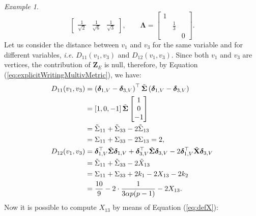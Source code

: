 \documentclass[12pt]{article}
\theoremstyle{plain}
\theoremstyle{remark}
\newtheorem*{example}{Example}
\newcommand{\round}[1]{\left( #1 \right)}
\renewcommand{\square}[1]{\left[ #1\right]}
\newcommand{\ie}{\textit{i.e. }}
\newcommand{\latMatr}[1]{\mathbf{#1}}          %
\newcommand{\grMatr}[1]{{\boldsymbol{#1}}}   %
\newcommand{\tobi}[1]{\textcolor{teal}{#1}}
\begin{document}
\begin{example}
\begin{equation*}
\begin{bmatrix}
                \frac{1}{\sqrt{2}} & \frac{1}{\sqrt{6}} & \frac{1}{\sqrt{3}}
            \end{bmatrix},
            \qquad
            {\grMatr{\Lambda}} = \begin{bmatrix}
                1 & & \\
                & \frac{1}{3} & \\
                & & 0
            \end{bmatrix}.
        \end{equation*}
        Let us consider the distance between $v_1$ and $v_3$ for the same variable and for different variables, \ie $D_{11}(v_1,v_3)$ and $D_{12}(v_1,v_3)$. Since both $v_1$ and $v_3$ are vertices, the contribution of $\boldsymbol{Z}_E$ is null, therefore, by Equation (\ref{eq:explicitWritingMultivMetric}), we have:
        \begin{align*}
            D_{11}(v_1,v_3)&=\round{\boldsymbol{\delta}_{ {1,V}}-\boldsymbol{\delta}_{ {3,V}}}^\top \Tilde {\grMatr{\Sigma}} \round{\boldsymbol{\delta}_{ {1,V}}-\boldsymbol{\delta}_{ {3,V}}} \\&= \square{1,0,-1}\Tilde {\grMatr{\Sigma}} \begin{bmatrix}
                1\\
                0\\
                -1
            \end{bmatrix} \\
            &=\Tilde{{{\Sigma}}}_{11}+\Tilde{{{\Sigma}}}_{33}-2\Tilde{{{\Sigma}}}_{13}\\
            &={{\Sigma}}_{11}+{{\Sigma}}_{33}-2{{\Sigma}}_{13}=2,\\
            D_{12}(v_1,v_3)&=\boldsymbol{\delta}_{ {1,V}}^\top \Tilde {\grMatr{\Sigma}} \boldsymbol{\delta}_{ {1,V}} + \boldsymbol{\delta}_{ {3,V}}^\top \Tilde {\grMatr{\Sigma}} \boldsymbol{\delta}_{ {3,V}}-2\boldsymbol{\delta}_{ {1,V}}^\top \Tilde {\latMatr{X}} \boldsymbol{\delta}_{ {3,V}}\\
            &=\Tilde{{\Sigma}}_{11}+\Tilde{{\Sigma}}_{33}-2\Tilde {{X}}_{13}\\
            &={{\Sigma}}_{11}+{{\Sigma}}_{33}+2k_1-2 {{X}}_{13} -2k_2\\
            &=\frac{10}{9}-2\cdot \frac{1}{3\alpha p (p-1)}-2{{X}}_{13}.
        \end{align*}
        Now it is possible to compute ${{X}}_{13}$ by means of Equation (\ref{eq:defX}): %
        \begin{align*}

\end{align*}
\end{example}
\end{document}
